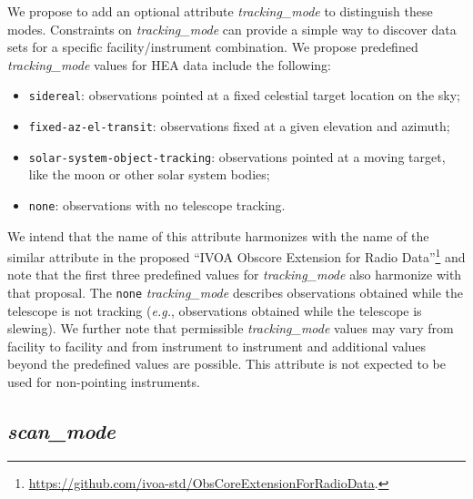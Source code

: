 \documentclass[11pt,a4paper]{ivoa}
\begin{document}
We propose to add an optional attribute {\em tracking\_mode\/} to distinguish these modes.  Constraints on {\em tracking\_mode\/} can provide a simple way to discover data sets for a specific facility/instrument combination.  We propose predefined {\em tracking\_mode\/} values for \gls{HEA} data include the following:
\begin{itemize}
	\item \texttt{sidereal}: observations pointed at a fixed celestial target location on the sky;
	\item \texttt{fixed-az-el-transit}: observations fixed at a given elevation and azimuth;
	\item \texttt{solar-system-object-tracking}: observations pointed at a moving target, like the moon or other solar system bodies;
	\item \texttt{none}: observations with no telescope tracking.
\end{itemize}
We intend that the name of this attribute harmonizes with the name of the similar attribute in the proposed ``IVOA Obscore Extension for Radio Data''\footnote{\url{https://github.com/ivoa-std/ObsCoreExtensionForRadioData}.} and note that the first three predefined values for {\em tracking\_mode\/} also harmonize with that proposal.  The \texttt{none} {\em tracking\_mode\/} describes observations obtained while the telescope is not tracking ({\em e.g.\/}, observations obtained while the telescope is slewing). We further note that permissible {\em tracking\_mode\/} values may vary from facility to facility and from instrument to instrument and additional values beyond the predefined values are possible. This attribute is not expected to be used for non-pointing instruments.

\subsection{{\em scan\_mode}}
\end{document}
